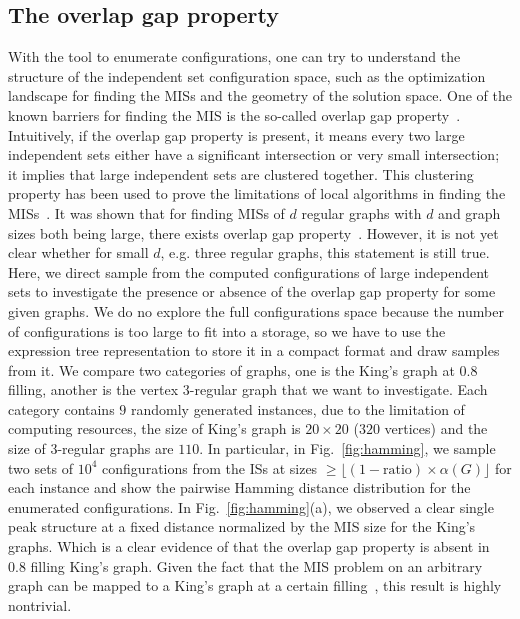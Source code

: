 \documentclass[onefignum, onetabnum]{siamart190516}
\newcommand{\<}{\langle}
\renewcommand{\>}{\rangle}
\newcommand{\Fig}[1]{Fig.~\ref{#1}}
\begin{document}
\subsection{The overlap gap property\label{sec:overlap-gap}}
With the tool to enumerate configurations, one can try to understand the structure of the independent set configuration space,
such as the optimization landscape for finding the MISs and the geometry of the solution space.
One of the known barriers for finding the MIS is the so-called overlap gap property~\cite{Gamarnik2013, Gamarnik2019}.
Intuitively, if the overlap gap property is present, it means every two large independent sets either have a significant intersection or very small intersection;
it implies that large independent sets are clustered together.
This clustering property has been used to prove the limitations of local algorithms in finding the MISs~\cite{Gamarnik2013, Gamarnik2019}.
It was shown that for finding MISs of $d$ regular graphs with $d$ and graph sizes both being large, there exists overlap gap property~\cite{Rahman2017,Gamarnik2021}.
However, it is not yet clear whether for small $d$, e.g. three regular graphs, this statement is still true.
Here, we direct sample from the computed configurations of large independent sets to investigate the presence or absence of the overlap gap property for some given graphs.
We do no explore the full configurations space because the number of configurations is too large to fit into a storage,
so we have to use the expression tree representation to store it in a compact format and draw samples from it.
We compare two categories of graphs, one is the King's graph at $0.8$ filling,
another is the vertex $3$-regular graph that we want to investigate.
Each category contains $9$ randomly generated instances, due to the limitation of computing resources,
the size of King's graph is $20\times 20$ ($320$ vertices) and the size of $3$-regular graphs are $110$.
In particular, in \Fig{fig:hamming}, 
we sample two sets of $10^4$ configurations from the ISs at sizes $\geq \lfloor (1-\text{ratio}) \times \alpha(G)\rfloor$ for each instance
 and show the pairwise Hamming distance distribution for the enumerated configurations.
In \Fig{fig:hamming}(a), we observed a clear single peak structure at a fixed distance normalized by the MIS size for the King's graphs.
Which is a clear evidence of that the overlap gap property is absent in $0.8$ filling King's graph.
Given the fact that the MIS problem on an arbitrary graph can be mapped to a King's graph at a certain filling~\cite{Ebadi2022}, this result is highly nontrivial.
\end{document}
